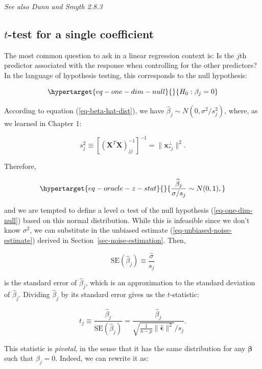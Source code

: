 \documentclass[
  11pt,
  letterpaper,
  oneside]{book}
\theoremstyle{definition}
\theoremstyle{plain}
\theoremstyle{plain}
\theoremstyle{plain}
\theoremstyle{remark}
\begin{document}
\emph{See also Dunn and Smyth 2.8.3}

\hypertarget{t-test-for-a-single-coefficient}{%
\subsection{\texorpdfstring{\(t\)-test for a single
coefficient}{t-test for a single coefficient}}\label{t-test-for-a-single-coefficient}}

The most common question to ask in a linear regression context is: Is
the \(j\)th predictor associated with the response when controlling for
the other predictors? In the language of hypothesis testing, this
corresponds to the null hypothesis:

\begin{equation}\protect\hypertarget{eq-one-dim-null}{}{
H_0: \beta_j = 0
}\label{eq-one-dim-null}\end{equation}

According to equation (\ref{eq-beta-hat-dist}), we have
\(\widehat{\beta}_j \sim N(0, \sigma^2/s_j^2)\), where, as we learned in
Chapter 1:

\[
s_j^{2} \equiv [(\boldsymbol{X}^T \boldsymbol{X})^{-1}_{jj}]^{-1} = \|\boldsymbol{x}_{*j}^\perp\|^2.
\]

Therefore,

\begin{equation}\protect\hypertarget{eq-oracle-z-stat}{}{
\frac{\widehat{\beta}_j}{\sigma/s_j} \sim N(0,1),
}\label{eq-oracle-z-stat}\end{equation}

and we are tempted to define a level \(\alpha\) test of the null
hypothesis (\ref{eq-one-dim-null}) based on this normal distribution.
While this is infeasible since we don't know \(\sigma^2\), we can
substitute in the unbiased estimate (\ref{eq-unbiased-noise-estimate})
derived in Section~\ref{sec-noise-estimation}. Then,

\[
\text{SE}(\widehat{\beta}_j) \equiv \frac{\widehat{\sigma}}{s_j}
\]

is the standard error of \(\widehat{\beta}_j\), which is an
approximation to the standard deviation of \(\widehat{\beta}_j\).
Dividing \(\widehat{\beta}_j\) by its standard error gives us the
\(t\)-statistic:

\[
t_j \equiv \frac{\widehat{\beta}_j}{\text{SE}(\widehat{\beta}_j)} = \frac{\widehat{\beta}_j}{\sqrt{\frac{1}{n-p}\|\boldsymbol{\widehat{\epsilon}}\|^2}/s_j}.
\]

This statistic is \emph{pivotal}, in the sense that it has the same
distribution for any \(\boldsymbol{\beta}\) such that \(\beta_j = 0\).
Indeed, we can rewrite it as:
\end{document}
